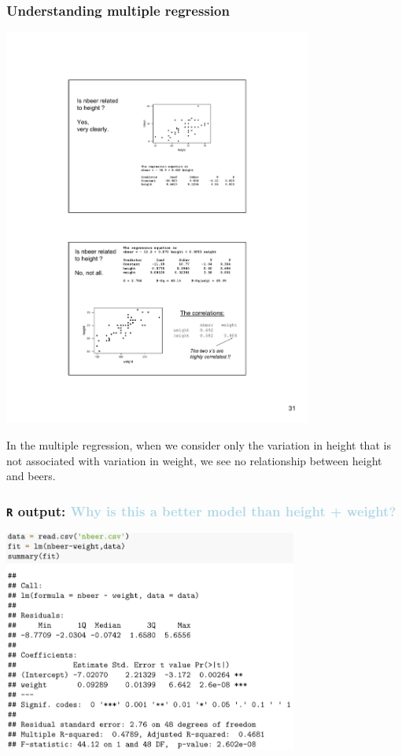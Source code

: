 \documentclass{beamer}
\newcommand{\lb}[1]{\textcolor{lightblue}{#1}}
\newcommand{\sk}{\vspace{.5cm}}
\begin{document}
\begin{frame}
\frametitle{Understanding multiple regression}


\includegraphics[width=4in]{figures/beer2}
\sk\sk

In the multiple regression, when we consider only the variation in height that is not associated with variation in weight, we see no relationship between height and beers.


\end{frame}

\begin{frame}
	\frametitle{{\tt R} output: \lb{\normalsize Why is this a better model than height + weight?}}
	
	\vspace{2mm}
\hspace*{2mm}\includegraphics[width=3.8in]{figures/beersMLR3}
	
\end{frame}
\end{document}
